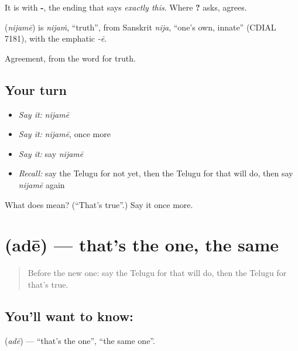 It is \textbf{} with \textbf{-}, the ending that says \emph{exactly this}. Where \textbf{?} asks, \textbf{} agrees.

\begin{cousinweb}
\textbf{} (\emph{nijamē}) is \emph{nijaṁ}, \textquotedblleft{}truth\textquotedblright{}, from Sanskrit \emph{nija}, \textquotedblleft{}one's own, innate\textquotedblright{} (CDIAL 7181), with the emphatic \emph{-ē}.
\end{cousinweb}

\begin{grammarlens}[title={What you've built}]
Agreement, from the word for truth.
\end{grammarlens}

\subsection*{Your turn}
\begin{itemize}
\raggedright
  \item \emph{Say it:} \emph{nijamē}
  \item \emph{Say it:} \emph{nijamē}, once more
  \item \emph{Say it:} say \emph{nijamē}
  \item \emph{Recall:} say the Telugu for not yet, then the Telugu for that will do, then say \emph{nijamē} again
\end{itemize}

\begin{tcolorbox}[breakable,colback=teal!4,colframe=teal!35!black,title={Before you move on}]
What does  mean? (\textquotedblleft{}That's true\textquotedblright{}.) Say it once more.
\end{tcolorbox}
\section[\texorpdfstring{\te{అదే} (adē)}{అదే (adē)}]{ (adē) — that's the one, the same}

\label{lesson:TE-C98-thatone}



\begin{quote}
Before the new one: say the Telugu for that will do, then the Telugu for that's true.
\end{quote}

\subsection*{You'll want to know: }
\textbf{} (\emph{adē}) — \textquotedblleft{}that's the one\textquotedblright{}, \textquotedblleft{}the same one\textquotedblright{}.

